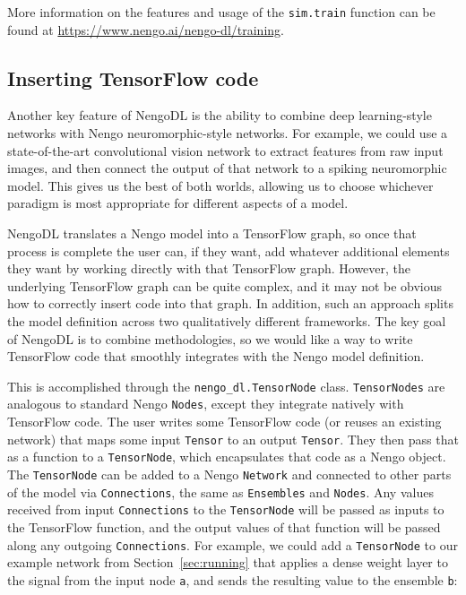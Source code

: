 \documentclass{article}
\begin{document}
More information on the features and usage of the \texttt{sim.train} function can be found at \url{https://www.nengo.ai/nengo-dl/training}.

\subsection{Inserting TensorFlow code}
\label{sec:tensornode}

Another key feature of NengoDL is the ability to combine deep learning-style networks with Nengo neuromorphic-style networks.  For example, we could use a state-of-the-art convolutional vision network to extract features from raw input images, and then connect the output of that network to a spiking neuromorphic model.  This gives us the best of both worlds, allowing us to choose whichever paradigm is most appropriate for different aspects of a model.

NengoDL translates a Nengo model into a TensorFlow graph, so once that process is complete the user can, if they want, add whatever additional elements they want by working directly with that TensorFlow graph.  However, the underlying TensorFlow graph can be quite complex, and it may not be obvious how to correctly insert code into that graph.  In addition, such an approach splits the model definition across two qualitatively different frameworks.  The key goal of NengoDL is to combine methodologies, so we would like a way to write TensorFlow code that smoothly integrates with the Nengo model definition.

This is accomplished through the \texttt{nengo\_dl.TensorNode} class.  \texttt{TensorNodes} are analogous to standard Nengo \texttt{Nodes}, except they integrate natively with TensorFlow code.  The user writes some TensorFlow code (or reuses an existing network) that maps some input \texttt{Tensor} to an output \texttt{Tensor}.  They then pass that as a function to a \texttt{TensorNode}, which encapsulates that code as a Nengo object.  The \texttt{TensorNode} can be added to a Nengo \texttt{Network} and connected to other parts of the model via \texttt{Connections}, the same as \texttt{Ensembles} and \texttt{Nodes}.  Any values received from input \texttt{Connections} to the \texttt{TensorNode} will be passed as inputs to the TensorFlow function, and the output values of that function will be passed along any outgoing \texttt{Connections}.  For example, we could add a \texttt{TensorNode} to our example network from Section~\ref{sec:running} that applies a dense weight layer to the signal from the input node \texttt{a}, and sends the resulting value to the ensemble \texttt{b}:
\end{document}
